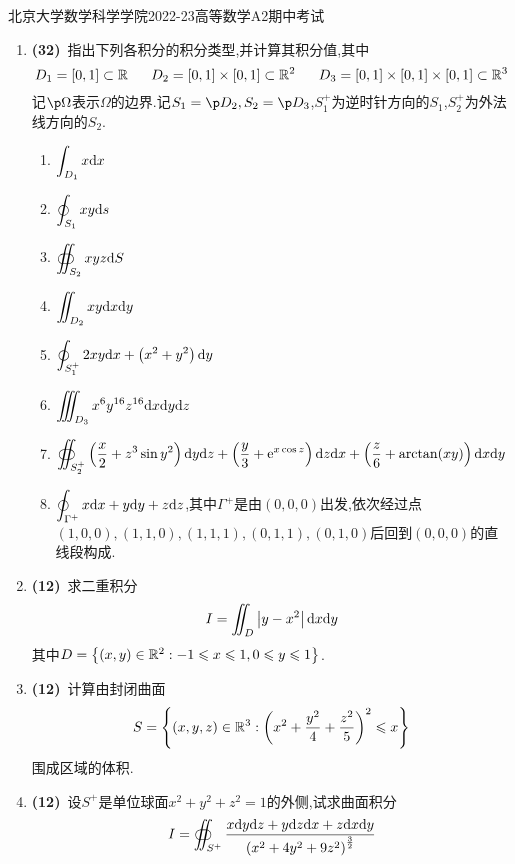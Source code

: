 \documentclass{ctexart}
\begin{document}
\pagestyle{empty}
\begin{center}\Large
    北京大学数学科学学院2022-23高等数学A2期中考试
\end{center}
\begin{enumerate}[leftmargin=*,label=\textbf{\arabic*.}]
    \item \textbf{(32)}\ 指出下列各积分的积分类型,并计算其积分值,其中
        \[D_1=[0,1]\subset\R\ \ \ \ \ D_2=[0,1]\times[0,1]\subset\R^2\ \ \ \ \ D_3=[0,1]\times[0,1]\times[0,1]\subset\R^3\]
        记$\p\Omega$表示$\Omega$的边界.记$S_1=\p D_2,S_2=\p D_3$,$S_1^+$为逆时针方向的$S_1$,$S_2^+$为外法线方向的$S_2$.
        \begin{enumerate}[label=\tbf{(\arabic*)}]
            \item $\displaystyle\int_{D_1}x\mathrm{d} x$
            \item $\displaystyle\oint_{S_1}xy\mathrm{d} s$
            \item $\displaystyle\oiint_{S_2}xyz\mathrm{d} S$
            \item $\displaystyle\iint_{D_2}xy\mathrm{d} x\mathrm{d} y$
            \item $\displaystyle\oint_{S_1^+}2xy\mathrm{d} x+\left(x^2+y^2\right)\mathrm{d} y$
            \item $\displaystyle\iiint_{D_3}x^6y^{16}z^{16}\mathrm{d} x\mathrm{d} y\mathrm{d} z$
            \item $\displaystyle\oiint_{S_2^+}\left(\dfrac x2+z^3\sin y^2\right)\mathrm{d} y\mathrm{d} z+\left(\dfrac y3+\mathrm{e}^{x\cos z}\right)\mathrm{d} z\mathrm{d} x+\left(\dfrac z6+\arctan(xy)\right)\mathrm{d} x\mathrm{d} y$
            \item $\displaystyle\oint_{\Gamma^+}x\mathrm{d} x+y\mathrm{d} y+z\mathrm{d} z$,其中$\Gamma^+$是由$(0,0,0)$出发,依次经过点$(1,0,0),(1,1,0),(1,1,1),(0,1,1),(0,1,0)$后回到$(0,0,0)$的直线段构成.
        \end{enumerate}

    \item \textbf{(12)}\ 求二重积分
        \[I=\iint_{D}\left|y-x^2\right|\mathrm{d} x\mathrm{d} y\]
        其中$D=\left\{(x,y)\in\mathbb{R}^2:-1\leqslant x\leqslant1,0\leqslant y\leqslant1\right\}$.

    \item \textbf{(12)}\ 计算由封闭曲面
        \[S=\left\{(x,y,z)\in\mathbb{R}^3:\left(x^2+\dfrac{y^2}{4}+\dfrac{z^2}{5}\right)^2\leqslant x\right\}\]
        围成区域的体积.

    \item \textbf{(12)}\ 设$S^+$是单位球面$x^2+y^2+z^2=1$的外侧,试求曲面积分
        \[I=\oiint_{S^+}\dfrac{x\mathrm{d} y\mathrm{d} z+y\mathrm{d} z\mathrm{d} x+z\mathrm{d} x\mathrm{d} y}{\left(x^2+4y^2+9z^2\right)^{\frac32}}\]
        

\end{enumerate}
\end{document}
